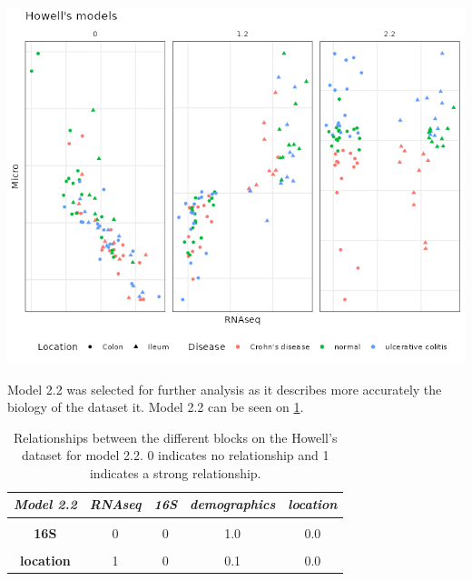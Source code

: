 \documentclass[
  12pt,
  a4paper,
  twoside,
  openright]{book}
\let\origfigure\figure
\let\endorigfigure\endfigure
\renewenvironment{figure}[1][2] {
    \expandafter\origfigure\expandafter[!ht]
} {
    \endorigfigure
}
\begin{document}
\begin{figure}
\includegraphics[width=1\linewidth]{images/howell-models} \caption[Models on Howeell's datset.]{The three main models, model 0, 1.2 and 2.2 on the Howell's dataset colored by section colon, ileum and shape according to the disease: square, ulcerative colitis; triangle, normal; circle, Crohn's disease. Model 0 has just trancriptomic and microbiome data, model 1.2 has transcriptomic, microbiome and sample data and model 2.2 has transcriptomic, microbiome and sample data split in different blocks.}\label{fig:howell-models}
\end{figure}

Model 2.2 was selected for further analysis as it describes more accurately the biology of the dataset it.
Model 2.2 can be seen on \ref{tab:howell-model2-2}.

\begin{table}[H]

\caption[Models 2.2 of Howell's dataset.]{\label{tab:howell-model2-2}Relationships between the different blocks on the Howell's dataset for model 2.2. 0 indicates no relationship and 1 indicates a strong relationship.}
\centering
\begin{tabular}[t]{|>{}c|c|c|c|>{}c|}
\hline
\em{\textbf{Model 2.2}} & \em{\textbf{RNAseq}} & \em{\textbf{16S}} & \em{\textbf{demographics}} & \em{\textbf{location}}\\
\hline
\textbf{\cellcolor{gray!6}{RNAseq}} & \cellcolor{gray!6}{0} & \cellcolor{gray!6}{0} & \cellcolor{gray!6}{0.0} & \cellcolor{gray!6}{1.0}\\
\hline
\textbf{16S} & 0 & 0 & 1.0 & 0.0\\
\hline
\textbf{\cellcolor{gray!6}{demographics}} & \cellcolor{gray!6}{0} & \cellcolor{gray!6}{1} & \cellcolor{gray!6}{0.0} & \cellcolor{gray!6}{0.1}\\
\hline
\textbf{location} & 1 & 0 & 0.1 & 0.0\\
\hline
\end{tabular}
\end{table}
\end{document}
